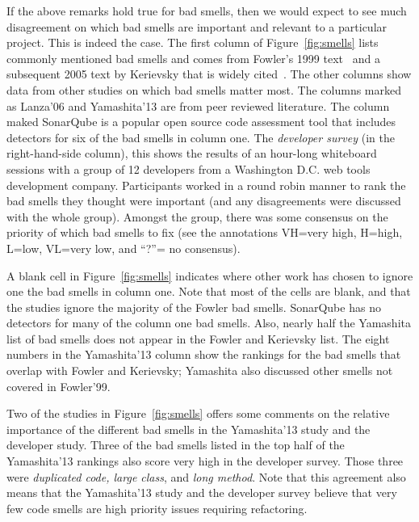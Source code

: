 \documentclass{sig-alternate}
\newcommand{\fig}[1]{Figure~\ref{fig:#1}}
\theoremstyle{break}
\begin{document}
If the above remarks hold true for bad smells, then we would expect
to see much disagreement on which bad smells are important and relevant
to  a particular project. This is indeed the case.
The first column of \fig{smells} 
lists  commonly mentioned bad smells and comes from Fowler's 1999 text~\cite{fowler99} and a subsequent 2005 text by Kerievsky that is widely cited~\cite{Kerievsky2005}.
The other
columns show data from other studies on which bad smells matter most.
The columns marked as Lanza'06 and Yamashita'13 are from peer reviewed literature. The column maked SonarQube is a popular open source
code assessment tool that includes detectors for six of the bad smells
in column one. 
The {\em developer survey}   (in the right-hand-side column),
   this shows the results of an hour-long whiteboard sessions with a group of 12 developers from a Washington
    D.C. web tools development company. Participants
    worked in a round robin manner to rank the bad smells they thought were
    important (and any disagreements were discussed with the whole group).
     Amongst the group, there was  some
    consensus on  the priority of which bad smells to fix
    (see the annotations VH=very high,
    H=high, L=low, VL=very low, and ``?''= no consensus).  
   
   
   


A  blank cell in \fig{smells}
indicates where   other work has chosen to ignore
one the   bad smells in column one. 
Note that most of the cells are blank, and that the studies ignore the majority of the Fowler bad smells.
SonarQube has no detectors for many of the column one bad smells.
Also, nearly half the Yamashita list of bad smells
    does not appear in the Fowler and Kerievsky list. The eight numbers
    in the  Yamashita'13 column show the rankings for the bad smells 
    that overlap with Fowler and Kerievsky; Yamashita also discussed other smells not covered in Fowler'99.
    

Two of the studies in \fig{smells} offers some comments on the relative importance
of the different bad smells in the Yamashita'13 study and the developer study. Three of the bad smells listed in the top half of the Yamashita'13 rankings also score very high in the developer survey. Those three were {\em duplicated code, large class}, 
        and {\em long method}. 
 Note that this agreement also means that the
  Yamashita'13 study and the developer survey   
  believe
        that very few  code smells are   high priority issues
        requiring refactoring. 
        
\end{document}
